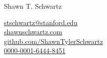 {\huge Shawn T. Schwartz} %
\bigskip\medskip



 \href{mailto:stschwartz@stanford.edu}{stschwartz@stanford.edu} \\
 \href{https://shawnschwartz.com}{shawnschwartz.com} \\
 \href{https://github.com/ShawnTylerSchwartz}{github.com/ShawnTylerSchwartz} \\
 \href{https://orcid.org/0000-0001-6444-8451}{0000-0001-6444-8451}
